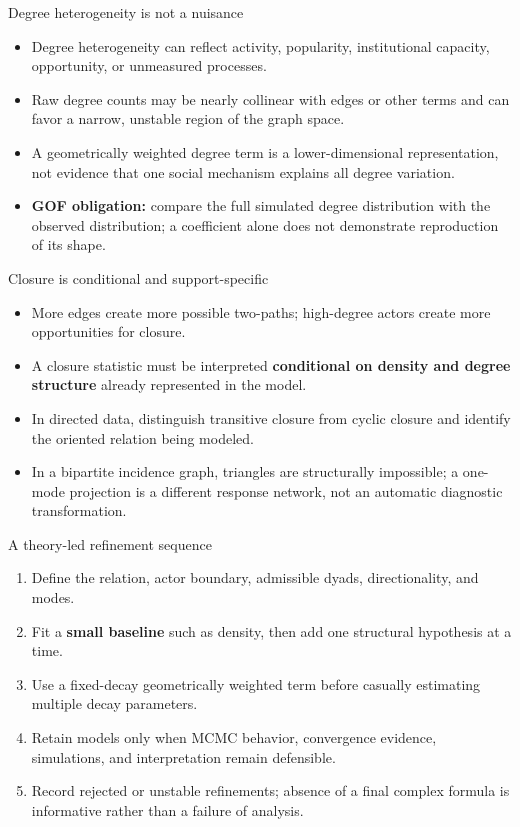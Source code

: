 \documentclass[aspectratio=169,11pt]{beamer}
\newcommand{\term}[1]{\textbf{\color{nupurple}#1}}
\begin{document}
\begin{frame}{Degree heterogeneity is not a nuisance}
\begin{itemize}
\item Degree heterogeneity can reflect activity, popularity, institutional capacity, opportunity, or unmeasured processes.
\item Raw degree counts may be nearly collinear with edges or other terms and can favor a narrow, unstable region of the graph space.
\item A geometrically weighted degree term is a lower-dimensional representation, not evidence that one social mechanism explains all degree variation.
\item \term{GOF obligation:} compare the full simulated degree distribution with the observed distribution; a coefficient alone does not demonstrate reproduction of its shape.
\end{itemize}
\end{frame}

\begin{frame}{Closure is conditional and support-specific}
\begin{itemize}
\item More edges create more possible two-paths; high-degree actors create more opportunities for closure.
\item A closure statistic must be interpreted \term{conditional on density and degree structure} already represented in the model.
\item In directed data, distinguish transitive closure from cyclic closure and identify the oriented relation being modeled.
\item In a bipartite incidence graph, triangles are structurally impossible; a one-mode projection is a different response network, not an automatic diagnostic transformation.
\end{itemize}
\end{frame}

\begin{frame}{A theory-led refinement sequence}
\begin{enumerate}
\item Define the relation, actor boundary, admissible dyads, directionality, and modes.
\item Fit a \term{small baseline} such as density, then add one structural hypothesis at a time.
\item Use a fixed-decay geometrically weighted term before casually estimating multiple decay parameters.
\item Retain models only when MCMC behavior, convergence evidence, simulations, and interpretation remain defensible.
\item Record rejected or unstable refinements; absence of a final complex formula is informative rather than a failure of analysis.
\end{enumerate}
\end{frame}
\end{document}
